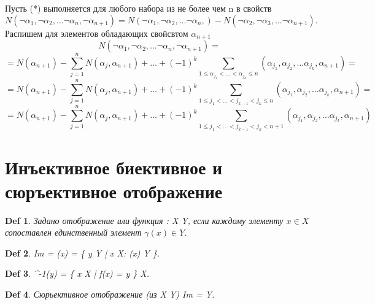\documentclass[a5paper, 10pt]{article}
\theoremstyle{plain}
\newtheorem{definition}{Def}
\begin{document}
    Пусть (*) выполняется для любого набора из не более чем n в свойств
    \[
        N(
            \neg \alpha_1,
            \neg \alpha_2,
            \dots
            \neg \alpha_n,
            \neg \alpha_{n + 1}
        ) = N(
            \neg \alpha_1,
            \neg \alpha_2,
            \dots
            \neg \alpha_n,
        ) - N(
            \neg \alpha_2,
            \neg \alpha_3,
            \dots
            \neg \alpha_{n + 1}
        )
    .\]
    Распишем
    для элементов обладающих свойсвтом $ \alpha_{n + 1} $
    \[
        N(
            \neg \alpha_1,
            \neg \alpha_2,
            \dots
            \neg \alpha_n,
            \neg \alpha_{n + 1}
        ) =
    \] \[
        = N(\alpha_{n + 1}) -
            \sum\limits_{j = 1}^n N(\alpha_j, \alpha_{n+1}) + \dots +
        (-1)^k \sum\limits_{1 \leq \alpha_{j_1} < \dots < \alpha_{j_k} \leq n}
        (\alpha_{j_1}, \alpha_{j_2}, \dots \alpha_{j_k}, \alpha_{n+1}) =
    \] \[
        = N(\alpha_{n + 1}) -
            \sum\limits_{j = 1}^n N(\alpha_j, \alpha_{n+1}) + \dots +
        (-1)^k \sum\limits_{1 \leq j_1 < \dots < j_{k-1} < j_k \leq n}
        (\alpha_{j_1}, \alpha_{j_2}, \dots \alpha_{j_k}, \alpha_{n+1}) =
    \] \[
        = N(\alpha_{n + 1}) -
            \sum\limits_{j = 1}^n N(\alpha_j, \alpha_{n+1}) + \dots +
        (-1)^k \sum\limits_{1 \leq j_1 < \dots < j_{k-1} < j_k < n + 1 }
        (\alpha_{j_1}, \alpha_{j_2}, \dots \alpha_{j_k}, \alpha_{n+1})
    \]

    \section{Инъективное биективное и сюръективное отображение    }

    \begin{definition}
        Задано отображение или функция \gamma: X \to Y, если
        каждому элементу $ x \in X $ сопоставлен единственный элемент
        $ \gamma(x) \in Y $.
    \end{definition}

    \begin{definition}
        Im \gamma = \gamma(x) = \{ y \in Y | x \in X: \gamma(x) \in Y \}.
    \end{definition}

    \begin{definition}
        \gamma^{-1}(y) = \{ x \in X | f(x) = y \} \subseteq X.
    \end{definition}

    \begin{definition}
        Сюрьективное отображение (из X  Y) Im \gamma = Y.
    \end{definition}
\end{document}
